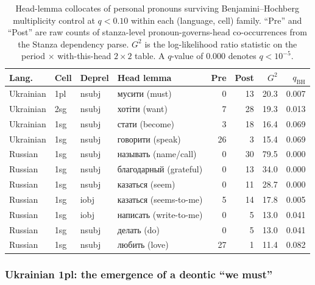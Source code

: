 \documentclass[12pt]{interact}
\theoremstyle{plain}%
\theoremstyle{definition}
\theoremstyle{remark}
\begin{document}
\begin{table}[h]
\centering
\caption{Head-lemma collocates of personal pronouns surviving Benjamini--Hochberg multiplicity control at $q < 0.10$ within each (language, cell) family. ``Pre'' and ``Post'' are raw counts of stanza-level pronoun-governs-head co-occurrences from the Stanza dependency parse. $G^2$ is the log-likelihood ratio statistic on the period $\times$ with-this-head $2\times 2$ table. A $q$-value of $0.000$ denotes $q < 10^{-5}$.}
\label{tab:rq3-bh-survivors}
\small
\begin{tabular}{llllrrrr}
\toprule
Lang. & Cell & Deprel & Head lemma & Pre & Post & $G^2$ & $q_{\text{BH}}$ \\
\midrule
Ukrainian & 1pl & nsubj & \textukrainian{мусити} (must)        &  0 & 13 & 20.3 & 0.007 \\
Ukrainian & 2sg & nsubj & \textukrainian{хотіти} (want)        &  7 & 28 & 19.3 & 0.013 \\
Ukrainian & 1sg & nsubj & \textukrainian{стати} (become)       &  3 & 18 & 16.4 & 0.069 \\
Ukrainian & 1sg & nsubj & \textukrainian{говорити} (speak)     & 26 &  3 & 15.4 & 0.069 \\
Russian   & 1sg & nsubj & \textukrainian{называть} (name/call) &  0 & 30 & 79.5 & 0.000 \\
Russian   & 1sg & nsubj & \textukrainian{благодарный} (grateful) &  0 & 13 & 34.0 & 0.000 \\
Russian   & 1sg & nsubj & \textukrainian{казаться} (seem)      &  0 & 11 & 28.7 & 0.000 \\
Russian   & 1sg & iobj  & \textukrainian{казаться} (seems-to-me) &  5 & 14 & 17.8 & 0.005 \\
Russian   & 1sg & iobj  & \textukrainian{написать} (write-to-me) &  0 &  5 & 13.0 & 0.041 \\
Russian   & 1sg & nsubj & \textukrainian{делать} (do)          &  0 &  5 & 13.0 & 0.041 \\
Russian   & 1sg & nsubj & \textukrainian{любить} (love)        & 27 &  1 & 11.4 & 0.082 \\
\bottomrule
\end{tabular}
\end{table}

\subsubsection{Ukrainian 1pl: the emergence of a deontic ``we must''}
\end{document}
